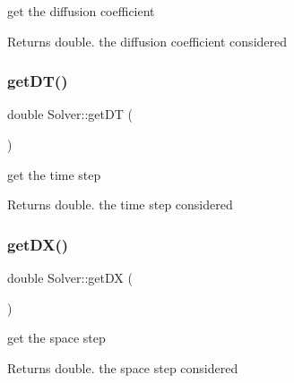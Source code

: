 get the diffusion coefficient
\begin{DoxyItemize}
\item \begin{DoxyReturn}{Returns}
double. the diffusion coefficient considered 
\end{DoxyReturn}

\end{DoxyItemize}\mbox{\label{classSolver_a560a332c3193d5709e1e5eb44bfaa322}} 
\subsubsection{\texorpdfstring{get\+D\+T()}{getDT()}}
{\footnotesize\ttfamily double Solver\+::get\+DT (\begin{DoxyParamCaption}{ }\end{DoxyParamCaption})}

get the time step
\begin{DoxyItemize}
\item \begin{DoxyReturn}{Returns}
double. the time step considered 
\end{DoxyReturn}

\end{DoxyItemize}\mbox{\label{classSolver_a6a05cda84ae4e3f3a187cf69f1407d81}} 
\subsubsection{\texorpdfstring{get\+D\+X()}{getDX()}}
{\footnotesize\ttfamily double Solver\+::get\+DX (\begin{DoxyParamCaption}{ }\end{DoxyParamCaption})}

get the space step
\begin{DoxyItemize}
\item \begin{DoxyReturn}{Returns}
double. the space step considered 
\end{DoxyReturn}

\end{DoxyItemize}\mbox{\label{classSolver_afb4f245f8c8109afb3301942d30b4544}} 
